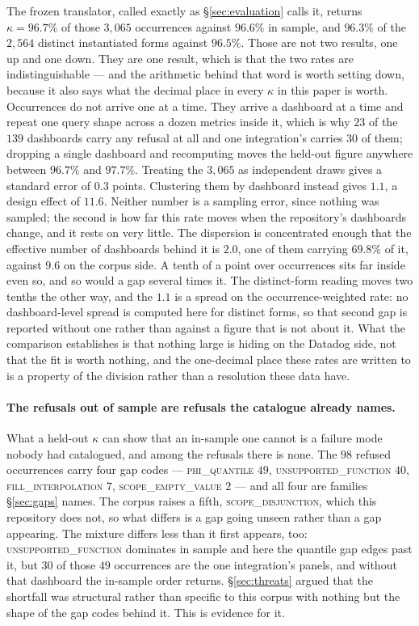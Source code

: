 The frozen translator, called exactly as \S\ref{sec:evaluation} calls it, returns
$\kappa=96.7\%$ of those $3{,}065$ occurrences against $96.6\%$ in sample, and $96.3\%$ of
the $2{,}564$ distinct instantiated forms against $96.5\%$. Those are not two results, one
up and one down. They are one result, which is that the two rates are indistinguishable
--- and the arithmetic behind that word is worth setting down, because it also says what
the decimal place in every $\kappa$ in this paper is worth. Occurrences do not arrive one
at a time. They arrive a dashboard at a time and repeat one query shape across a dozen
metrics inside it, which is why $23$ of the $139$ dashboards carry any refusal at all and
one integration's carries $30$ of them; dropping a single dashboard and recomputing moves
the held-out figure anywhere between $96.7\%$ and $97.7\%$. Treating the $3{,}065$ as
independent draws gives a standard error of $0.3$ points. Clustering them by
dashboard instead gives $1.1$, a design effect of $11.6$. Neither number is a sampling error, since nothing
was sampled; the second is how far this rate moves when the repository's dashboards
change, and it rests on very little. The dispersion is concentrated enough that the
effective number of dashboards behind it is $2.0$, one of them carrying $69.8\%$ of it,
against $9.6$ on the corpus side. A tenth of a point over occurrences sits far
inside even so, and so would a gap several times it. The distinct-form reading moves two
tenths the other way, and the $1.1$ is a spread on the occurrence-weighted rate: no
dashboard-level spread is computed here for distinct forms, so that second gap is
reported without one rather than against a figure that is not about it. What the comparison establishes is that nothing large is hiding on the Datadog
side, not that the fit is worth nothing, and the one-decimal place these rates are
written to is a property of the division rather than a resolution these data have.

\paragraph{The refusals out of sample are refusals the catalogue already names.}
What a held-out $\kappa$ can show that an in-sample one cannot is a failure mode nobody
had catalogued, and among the refusals there is none. The $98$ refused occurrences carry
four gap codes --- \textsc{phi\_quantile} $49$, \textsc{unsupported\_function} $40$,
\textsc{fill\_interpolation} $7$, \textsc{scope\_empty\_value} $2$ --- and all four are
families \S\ref{sec:gaps} names. The corpus raises a fifth, \textsc{scope\_disjunction},
which this repository does not, so what differs is a gap going unseen rather than a gap
appearing. The mixture differs less than it first appears, too:
\textsc{unsupported\_function} dominates in sample and here the quantile gap edges past
it, but $30$ of those $49$ occurrences are the one integration's panels, and without that
dashboard the in-sample order returns. \S\ref{sec:threats} argued that the shortfall was
structural rather than specific to this corpus with nothing but the shape of the gap
codes behind it. This is evidence for it.

